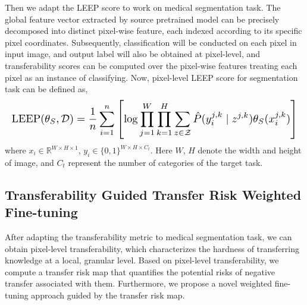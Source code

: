 Then we adapt the LEEP score to work on medical segmentation task. The global feature vector extracted by source pretrained model can be precisely decomposed into distinct pixel-wise feature, each indexed according to its specific pixel coordinates. Subsequently, classification will be conducted on each pixel in input image, and output label will also be obtained at pixel-level, and transferability scores can be computed over the pixel-wise features treating each pixel as an instance of classifying. Now, pixel-level LEEP score for segmentation task can be defined as,
\begin{equation}
\label{LEEP-trans}
\resizebox{\columnwidth}{!}{%
    $\displaystyle %
    \operatorname{LEEP}(\theta_S,\mathcal{D}) = 
    \frac{1}{n} \sum_{i = 1}^{n} \left[ 
        \log \prod_{j = 1}^{W} \prod_{k = 1}^{H} \sum_{z \in \mathcal{Z}} 
        \hat{P}(y_i^{j,k} \mid z^{j,k}) \theta_S(x_i^{j,k})
    \right]
    $%
}
\end{equation}
where $x_i \in \mathbb{R}^{W\times H\times1}$, $y_i \in \{0,1\}^{W\times H\times C_t}$. Here $W$, $H$ denote the width and height of image, and $C_t$ represent the number of categories of the target task.
\subsection{Transferability Guided Transfer Risk Weighted Fine-tuning}
After adapting the transferability metric to medical segmentation task, we can obtain pixel-level transferability, which characterizes the hardness of transferring knowledge at a local, granular level. Based on pixel-level transferability, we compute a transfer risk map that quantifies the potential risks of negative transfer associated with them. Furthermore, we propose a novel weighted fine-tuning approach guided by the transfer risk map. 

